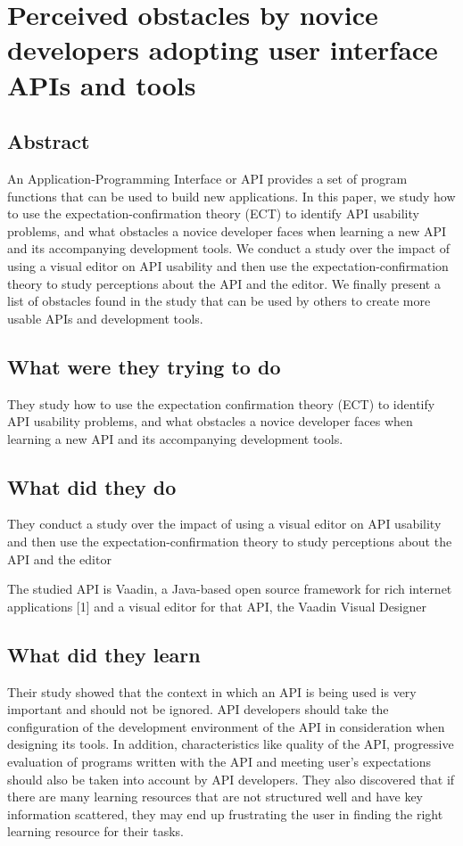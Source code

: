 \section{Perceived obstacles by novice developers adopting user interface APIs and tools}

\subsection{Abstract}

An Application-Programming Interface or API provides a set of program functions that can be used to build new applications. In this paper, we study how to use the expectation-confirmation theory (ECT) to identify API usability problems, and what obstacles a novice developer faces when learning a new API and its accompanying development tools. We conduct a study over the impact of using a visual editor on API usability and then use the expectation-confirmation theory to study perceptions about the API and the editor. We finally present a list of obstacles found in the study that can be used by others to create more usable APIs and development tools.

\subsection{What were they trying to do}

They study how to use the expectation confirmation theory (ECT) to identify API usability problems, and what obstacles a novice developer faces when learning a new API and its accompanying development tools.

\subsection{What did they do}

They conduct a study over the impact of using a visual editor on API usability and then use the expectation-confirmation theory to study perceptions about the API and the editor

The studied API is Vaadin, a Java-based open source framework for rich internet applications [1] and a visual editor for that API, the Vaadin Visual Designer

\subsection{What did they learn}

Their study showed that the context in which an API is being used
is very important and should not be ignored. API developers
should take the configuration of the development environment
of the API in consideration when designing its tools. In
addition, characteristics like quality of the API, progressive
evaluation of programs written with the API and meeting
user’s expectations should also be taken into account by API
developers. They also discovered that if there are many learning
resources that are not structured well and have key information
scattered, they may end up frustrating the user in finding the
right learning resource for their tasks.

